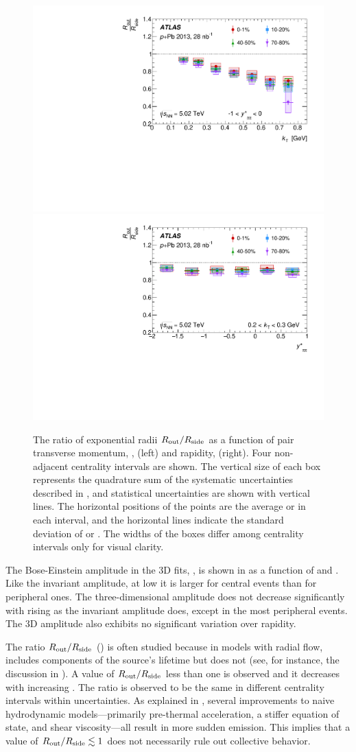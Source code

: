 \begin{figure}[ht]
\centering
\includegraphics[width=0.49\linewidth]{canqosl_RoutOverRside_vs_kt.pdf}
\includegraphics[width=0.49\linewidth]{canqosl_RoutOverRside_vs_kys.pdf}
\caption{The ratio of exponential radii $R_{\mathrm{out}}/R_{\mathrm{side}}$ as a function of pair transverse momentum, \kt, (left) and rapidity, \kys (right). Four non-adjacent centrality intervals are shown. The vertical size of each box represents the quadrature sum of the systematic uncertainties described in , and statistical uncertainties are shown with vertical lines. The horizontal positions of the points are the average \kt or \kys in each interval, and the horizontal lines indicate the standard deviation of \kt or \kys. The widths of the boxes differ among centrality intervals only for visual clarity.}
\label{fig:results_RoutOverRside_kt}
\end{figure}

The Bose-Einstein amplitude in the 3D fits, \losl, is shown in  as a function of \kt and \kys. Like the invariant amplitude, at low \kt it is larger for central events than for peripheral ones. The three-dimensional amplitude does not decrease significantly with rising \kt as the invariant amplitude does, except in the most peripheral events. The 3D amplitude also exhibits no significant variation over rapidity.

The ratio $R_{\mathrm{out}}/R_{\mathrm{side}}$ () is often studied because in models with radial flow, \Rout includes components of the source's lifetime but \Rside does not (see, for instance, the discussion in ).
A value of $R_{\mathrm{out}}/R_{\mathrm{side}}$ less than one is observed and it decreases with increasing \kt.
The ratio is observed to be the same in different centrality intervals within uncertainties.
As explained in , several improvements to naive hydrodynamic models---primarily pre-thermal acceleration, a stiffer equation of state, and shear viscosity---all result in more sudden emission.
This implies that a value of $R_{\mathrm{out}}/R_{\mathrm{side}} \lesssim 1$ does not necessarily rule out collective behavior.

